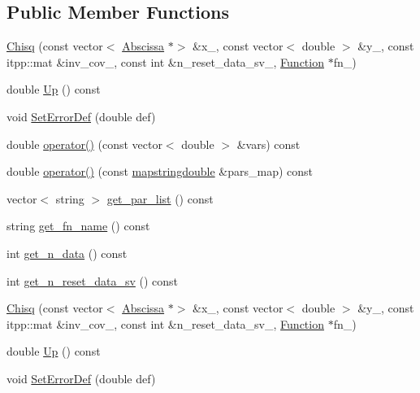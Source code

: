 \subsection*{Public Member Functions}
\begin{DoxyCompactItemize}
\item 
\mbox{\hyperlink{classChisq_a625fc6e1e3ffc8faa123f2f50f54a22b}{Chisq}} (const vector$<$ \mbox{\hyperlink{classAbscissa}{Abscissa}} $\ast$$>$ \&x\+\_\+, const vector$<$ double $>$ \&y\+\_\+, const itpp\+::mat \&inv\+\_\+cov\+\_\+, const int \&n\+\_\+reset\+\_\+data\+\_\+sv\+\_\+, \mbox{\hyperlink{classFunction}{Function}} $\ast$fn\+\_\+)
\item 
double \mbox{\hyperlink{classChisq_a3cc0c9f3bf8b806ce836537bc3d94686}{Up}} () const
\item 
void \mbox{\hyperlink{classChisq_a0707a4c0241bb82e81d2c5a9c1a303d7}{Set\+Error\+Def}} (double def)
\item 
double \mbox{\hyperlink{classChisq_a321122741639e94feeb3bff1eeadd1e7}{operator()}} (const vector$<$ double $>$ \&vars) const
\item 
double \mbox{\hyperlink{classChisq_a32a21d511405fc53af969f0984abc54f}{operator()}} (const \mbox{\hyperlink{lib_2fitting__lib_2includes_8h_a647b481c557c7966517f753340a81d13}{mapstringdouble}} \&pars\+\_\+map) const
\item 
vector$<$ string $>$ \mbox{\hyperlink{classChisq_a2c9e190b411d2e6b225d2ca32b950a1e}{get\+\_\+par\+\_\+list}} () const
\item 
string \mbox{\hyperlink{classChisq_a43f74965844bd0b1aa8a323e973728e6}{get\+\_\+fn\+\_\+name}} () const
\item 
int \mbox{\hyperlink{classChisq_aab815b002c716da22d72ef225aa1bbec}{get\+\_\+n\+\_\+data}} () const
\item 
int \mbox{\hyperlink{classChisq_a5dfe38f15b32fc23fb8530f7a4daf3e0}{get\+\_\+n\+\_\+reset\+\_\+data\+\_\+sv}} () const
\item 
\mbox{\hyperlink{classChisq_a625fc6e1e3ffc8faa123f2f50f54a22b}{Chisq}} (const vector$<$ \mbox{\hyperlink{classAbscissa}{Abscissa}} $\ast$$>$ \&x\+\_\+, const vector$<$ double $>$ \&y\+\_\+, const itpp\+::mat \&inv\+\_\+cov\+\_\+, const int \&n\+\_\+reset\+\_\+data\+\_\+sv\+\_\+, \mbox{\hyperlink{classFunction}{Function}} $\ast$fn\+\_\+)
\item 
double \mbox{\hyperlink{classChisq_a3cc0c9f3bf8b806ce836537bc3d94686}{Up}} () const
\item 
void \mbox{\hyperlink{classChisq_a0707a4c0241bb82e81d2c5a9c1a303d7}{Set\+Error\+Def}} (double def)

\end{DoxyCompactItemize}
